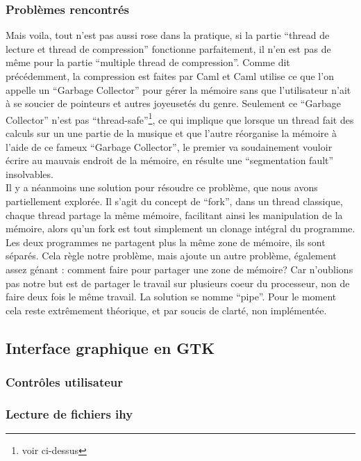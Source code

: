 \documentclass[a4paper,12pt]{article}
\begin{document}
		\subsubsection{Problèmes rencontrés}
Mais voila,  tout n'est  pas aussi rose dans la  pratique,  si la partie
``thread de lecture et  thread de compression'' fonctionne parfaitement,
il  n'en  est   pas  de  même  pour  la   partie  ``multiple  thread  de
compression''.  Comme dit  précédemment,  la compression est  faites par
Caml et Caml  utilise ce que l'on appelle  un ``Garbage Collector'' pour
gérer la mémoire sans que l'utilisateur  n'ait à se soucier de pointeurs
et autres joyeusetés du genre.  Seulement ce ``Garbage Collector'' n'est
pas  ``thread-safe''\footnote{voir  ci-dessus},   ce  qui  implique  que
lorsque un thread  fait des calculs sur  un une partie de  la musique et
que  l'autre réorganise  la mémoire  à  l'aide  de  ce  fameux ``Garbage
Collector'',  le  premier  va  soudainement  vouloir  écrire  au mauvais
endroit  de   la  mémoire,   en   résulte  une   ``segmentation  fault''
insolvables.\\
Il y a néanmoins une solution pour résoudre ce problème,  que nous avons
partiellement  explorée.  Il s'agit  du  concept  de  ``fork'',  dans un
thread  classique,  chaque thread  partage la  même mémoire,  facilitant
ainsi  les  manipulation  de  la  mémoire,  alors  qu'un  fork  est tout
simplement  un clonage  intégral du  programme.  Les deux  programmes ne
partagent plus la  même zone de mémoire,  ils  sont séparés.  Cela règle
notre problème,  mais ajoute un autre problème, également assez génant :
comment faire  pour partager  une zone  de mémoire?  Car  n'oublions pas
notre but est de partager le  travail sur plusieurs coeur du processeur,
non de faire deux fois le  même travail.  La solution se nomme ``pipe''.
Pour  le moment  cela reste  extrêmement  théorique,  et  par  soucis de
clarté, non implémentée.\\

	\subsection{Interface graphique en GTK}

		\subsubsection{Contrôles utilisateur}

		\subsubsection{Lecture de fichiers ihy}
\end{document}
